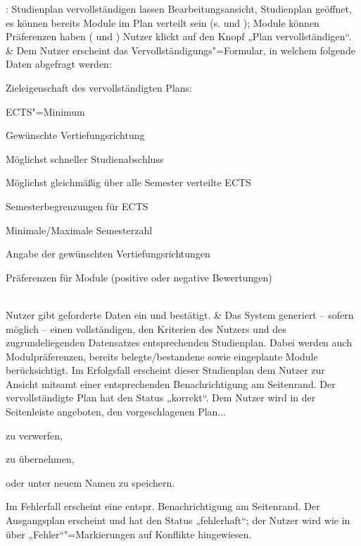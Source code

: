 \begin{usecase}{: Studienplan vervollständigen lassen}
	{Bearbeitungsansicht, Studienplan geöffnet, es können bereits Module im Plan verteilt sein (s.  und ); Module können Präferenzen haben ( und )}
	Nutzer klickt auf den Knopf „Plan vervollständigen“.
	& Dem Nutzer erscheint das Vervollständigungs"=Formular, in welchem folgende Daten abgefragt werden:
	\begin{tblitemize}
		\item Zieleigenschaft des vervollständigten Plans:
		\begin{tblitemize}
			\item ECTS"=Minimum
			\item Gewünschte Vertiefungsrichtung
			\item Möglichst schneller Studienabschluss
			\item Möglichst gleichmäßig über alle Semester verteilte ECTS
		\end{tblitemize}
		\item Semesterbegrenzungen für ECTS
		\item Minimale/Maximale Semesterzahl
		\item Angabe der gewünschten Vertiefungsrichtungen
		\item Präferenzen für Module (positive oder negative Bewertungen)
	\end{tblitemize} \\
	\hline
	Nutzer gibt geforderte Daten ein und bestätigt.
	& Das System generiert – sofern möglich – einen vollständigen, den Kriterien des Nutzers und des zugrundeliegenden Datensatzes entsprechenden Studienplan. Dabei werden auch Modulpräferenzen, bereits belegte/bestandene sowie eingeplante Module berücksichtigt. \newline
	Im Erfolgsfall erscheint dieser Studienplan dem Nutzer zur Ansicht mitsamt einer entsprechenden \gls{Benachrichtigung} am Seitenrand. Der vervollständigte Plan hat den Status „korrekt“. Dem Nutzer wird in der Seitenleiste angeboten, den vorgeschlagenen Plan...
	\begin{tblitemize}
		\item zu verwerfen,
		\item zu übernehmen,
		\item oder unter neuem Namen zu speichern.
	\end{tblitemize} \newline
	Im Fehlerfall erscheint eine entspr. \gls{Benachrichtigung} am Seitenrand. Der Ausgangsplan erscheint und hat den Status „fehlerhaft“; der Nutzer wird wie in  über „Fehler“"=Markierungen auf Konflikte hingewiesen. \\

\end{usecase}

